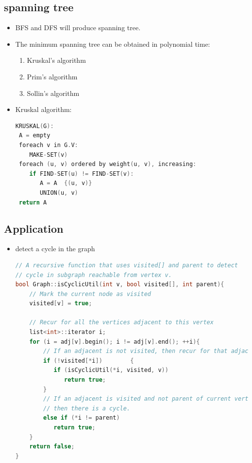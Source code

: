 \documentclass[a4paper,12pt,twoside]{book}
\begin{document}
\subsection{spanning tree}
\begin{itemize}
\item 	BFS and DFS will produce spanning tree. 
\item The minimum spanning tree can be obtained in polynomial time:
\begin{enumerate}
\item Kruskal's algorithm
\item Prim's algorithm
\item Sollin's algorithm
\end{enumerate}

\item Kruskal algorithm:
\begin{lstlisting}[frame=single, language=c++]
KRUSKAL(G):
 A = empty
 foreach v in G.V:
    MAKE-SET(v)
 foreach (u, v) ordered by weight(u, v), increasing:
    if FIND-SET(u) != FIND-SET(v):
       A = A  {(u, v)}
       UNION(u, v)
 return A
\end{lstlisting}

\end{itemize}


\subsection{Application}
\begin{itemize}
\item detect a cycle in the graph
\begin{lstlisting}[frame=single, language=c++]
// A recursive function that uses visited[] and parent to detect
// cycle in subgraph reachable from vertex v.
bool Graph::isCyclicUtil(int v, bool visited[], int parent){
    // Mark the current node as visited
    visited[v] = true;
 
    // Recur for all the vertices adjacent to this vertex
    list<int>::iterator i;
    for (i = adj[v].begin(); i != adj[v].end(); ++i){
        // If an adjacent is not visited, then recur for that adjacent
        if (!visited[*i])        {
           if (isCyclicUtil(*i, visited, v))
              return true;
        }
        // If an adjacent is visited and not parent of current vertex,
        // then there is a cycle.
        else if (*i != parent)
           return true;
    }
    return false;
}
\end{lstlisting}

\end{itemize}
\end{document}
